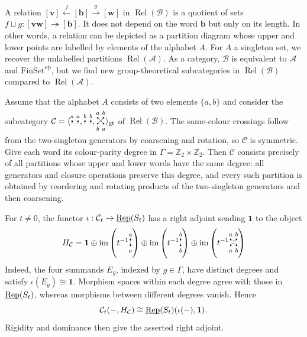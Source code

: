 \documentclass[11pt]{amsart}
\newcommand{\pdg}[3]{%
    \filldraw[black] (#1) circle (1.5pt) node[anchor=#2,inner sep=0] {$\scriptstyle{\strut #3}$}
}
\theoremstyle{definition}
\theoremstyle{remark}
\newcommand\cA{\mathcal A}
\newcommand\cB{\mathcal B}
\newcommand\cC{\mathcal C}
\newcommand\uRep{\underline{\smash{\operatorname{Rep}}}}
\newcommand\im{\operatorname{im}}
\renewcommand\:\colon
\newcommand\one{\mathbf{1}}
\newcommand\ZZ{\mathbb Z}
\renewcommand\:\colon
\newcommand\Rel{\operatorname{Rel}}
\newcommand\FinSet{\mathrm{FinSet}}
\newcommand\op{^{\mathrm{op}}}
\newcommand\angl[1]{\langle{}#1\rangle{}} %
\newcommand\gtcategory[1]{\angl{#1}_{\mathrm{gt}}}
\newcommand\tto{\twoheadrightarrow}
\begin{document}
A relation $[\mathbf{v}] \xleftarrow{f} [\mathbf{b}] \xrightarrow{g} [\mathbf{w}]$ in $\Rel(\cB)$ is a quotient of sets $f \sqcup g: [\mathbf{vw}] \tto [\mathbf{b}]$. It does not depend on the word $\mathbf{b}$ but only on its length. In other words, a relation can be depicted as a partition diagram whose upper and lower points are labelled by elements of the alphabet $A$. For $A$ a singleton set, we recover the unlabelled partitions $\Rel(\cA)$. As a category, $\cB$ is equivalent to $\cA$ and $\FinSet\op$, but we find new group-theoretical subcategories in $\Rel(\cB)$ compared to $\Rel(\cA)$.

\begin{example} \label{ex:klein-four-group}
    Assume that the alphabet $A$ consists of two elements $\{a, b\}$ and consider the subcategory $\cC = \gtcategory{\tikz[scale=0.5]{
        \pdg{0,.5}{south}{a};
        \draw (0,.3) -- (0,.5);
        \pdg{0.5,.5}{south}{a};
        \draw (0.5,.3) -- (0.5,.5);
    },  \tikz[scale=0.5]{
        \pdg{0,.5}{south}{b};
        \draw (0,.3) -- (0,.5);
        \pdg{0.5,.5}{south}{b};
        \draw (0.5,.3) -- (0.5,.5);
    }, \tikz[scale=0.5,baseline=0pt]{
        \pdg{0,.5}{south}{a}; \pdg{.5,.5}{south}{b};
        \pdg{0,0}{north}{b}; \pdg{.5,0}{north}{a};
        \draw (0,.5) -- (.5,0); \draw (.5,.5) -- (0,0);
    }}$ of $\Rel(\cB)$. The same-colour crossings follow from the two-singleton generators by coarsening and rotation, so $\cC$ is symmetric. Give each word its colour-parity degree in $\Gamma=\ZZ_2\times\ZZ_2$. Then $\cC$ consists precisely of all partitions whose upper and lower words have the same degree: all generators and closure operations preserve this degree, and every such partition is obtained by reordering and rotating products of the two-singleton generators and then coarsening.

    For $t \ne 0$, the functor $\iota: \cC_t \to \uRep(S_t)$ has a right adjoint sending $\one$ to the object
    \[
        H_\cC = \one \oplus \im\left(t^{-1} \tikz[baseline=(origin.base),scale=0.5]{
            \coordinate (origin) at (0,0);
            \pdg{0,0}{north}{a}; \pdg{0,.5}{south}{a};
            \draw (0,0) -- (0,.18); \draw (0,.32) -- (0,.5);
        }\right) \oplus \im\left(t^{-1} \tikz[baseline=(origin.base),scale=0.5]{
            \coordinate (origin) at (0,0);
            \pdg{0,0}{north}{b}; \pdg{0,.5}{south}{b};
            \draw (0,0) -- (0,.18); \draw (0,.32) -- (0,.5);
        }\right) \oplus \im\left(t^{-1} \tikz[baseline=(origin.base),scale=0.5]{
            \coordinate (origin) at (0,0);
            \pdg{0,0}{north}{a}; \pdg{0,.5}{south}{a};
            \pdg{.5,0}{north}{b}; \pdg{.5,.5}{south}{b};
        \draw (0,.5) to[out=down,in=down] (.5,.5);
        \draw (0,0) to[out=up,in=up] (.5,0);
        }\right)
    \]
    Indeed, the four summands $E_g$, indexed by $g\in\Gamma$, have distinct degrees and satisfy $\iota(E_g)\cong\one$. Morphism spaces within each degree agree with those in $\uRep(S_t)$, whereas morphisms between different degrees vanish. Hence
    \[
        \cC_t(-,H_\cC)\cong\uRep(S_t)(\iota(-),\one).
    \]
    Rigidity and dominance then give the asserted right adjoint.


\end{example}
\end{document}
